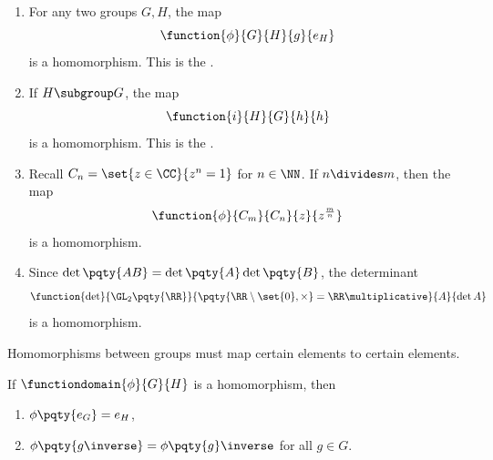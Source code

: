 \begin{examples*}
    \begin{enumerate}
        \item For any two groups \(G, H\), the map
        \[
            \function{\phi}{G}{H}{g}{e_{H}}
        \]
        is a homomorphism. This is the .
        
        \item If \(H \subgroup G\), the map
        \[
            \function{i}{H}{G}{h}{h}
        \]
        is a homomorphism. This is the .

        \item Recall \(C_n = \set{z \in \CC}{z^n = 1}\) for \(n \in \NN\). If \(n \divides m\), then the map
        \[
            \function{\phi}{C_m}{C_n}{z}{z^{\frac{m}{n}}}
        \]
        is a homomorphism.

        \item Since \(\det \pqty{AB} = \det \pqty{A} \det \pqty{B}\), the determinant
        \[
            \function{\det}{\GL_2\pqty{\RR}}{\pqty{\RR \setminus \set{0}, \times} = \RR\multiplicative}{A}{\det A}
        \]
        is a homomorphism.
    \end{enumerate}
\end{examples*}

Homomorphisms between groups must map certain elements to certain elements.

\begin{lemma}
    \label{lem:homomorphism-preserve-identity-inverse}%
    If \(\functiondomain{\phi}{G}{H}\) is a homomorphism, then
    \begin{enumerate}
        \item \(\phi\pqty{e_G} = e_H\),
        \item \(\phi\pqty{g\inverse} = \phi\pqty{g}\inverse\) for all \(g \in G\).
    \end{enumerate}
\end{lemma}

